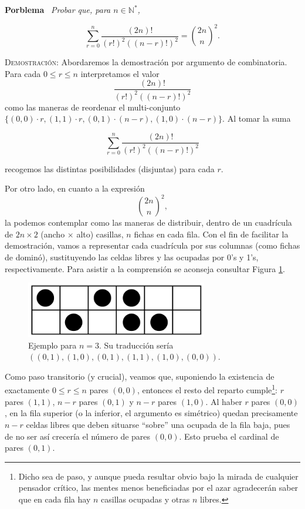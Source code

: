 \documentclass{article}
\begin{document}
\vspace{12px}

\noindent\textbf{Porblema} \, \textit{Probar que, para $n \in \mathbb{N}^*$,}

\[\sum_{r=0}^{n} \frac{(2n)!}{(r!)^2((n-r)!)^2} = \binom{2n}{n}^2.\]

\noindent\textsc{Demostración}: Abordaremos la demostración por argumento de combinatoria. Para cada $0 \leq r \leq n$ interpretamos el valor \[\frac{(2n)!}{(r!)^2((n-r)!)^2}\] como las maneras de reordenar el multi-conjunto $\{(0, 0) \cdot r, (1, 1) \cdot r, (0, 1) \cdot (n - r), (1, 0) \cdot (n - r)\}$. Al tomar la suma

\begin{equation}
    \sum_{r=0}^{n}\frac{(2n)!}{(r!)^2((n-r)!)^2}
    \label{eq:eq001}
\end{equation}

\noindent recogemos las distintas posibilidades (disjuntas) para cada $r$.

Por otro lado, en cuanto a la expresión \begin{equation}
\binom{2n}{n}^2,
\label{eq:eq002}
\end{equation} la podemos contemplar como las maneras de distribuir, dentro de un cuadrícula de $2n \times 2$ (ancho $\times$ alto) casillas, $n$ fichas en cada fila.
Con el fin de facilitar la demostración, vamos a representar cada cuadrícula por sus columnas (como fichas de dominó), sustituyendo las celdas libres y las ocupadas por 0's y 1's, respectivamente. Para asistir a la comprensión se aconseja consultar Figura \ref{fig:tiling}.

\begin{figure}[h!]
    \centering
    \includegraphics[width=300px]{tilings.png}
    \caption{Ejemplo para $n = 3$. Su traducción sería $((0, 1), (1, 0), (0, 1), (1, 1), (1, 0), (0, 0))$.}
    \label{fig:tiling}
\end{figure}

Como paso transitorio (y crucial), veamos que, suponiendo la existencia de exactamente $0 \leq r \leq n$ pares $(0, 0)$, entonces el resto del reparto cumple\footnote{Dicho sea de paso, y aunque pueda resultar obvio bajo la mirada de cualquier pensador crítico, las mentes menos beneficiadas por el azar agradecerán saber que en cada fila hay $n$ casillas ocupadas y otras $n$ libres.}: $r$ pares $(1, 1)$, $n - r$ pares $(0, 1)$ y $n - r$ pares $(1, 0)$.
Al haber $r$ pares $(0, 0)$, en la fila superior (o la inferior, el argumento es simétrico) quedan precisamente $n - r$ celdas libres que deben situarse ``sobre'' una ocupada de la fila baja, pues de no ser así crecería el número de pares $(0, 0)$. Esto prueba el cardinal de pares $(0, 1)$.
\end{document}
